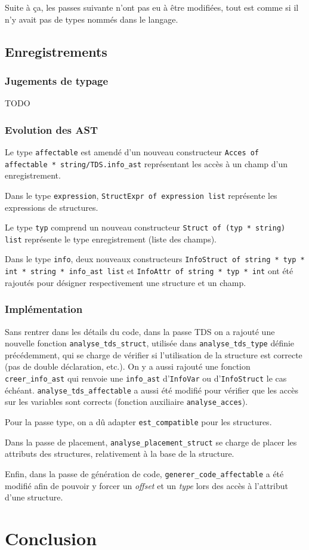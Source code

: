 \documentclass[headings=standardclasses,parskip=half]{scrartcl}
\begin{document}
Suite à ça, les passes suivante n'ont pas eu à être modifiées, tout
est comme si il n'y avait pas de types nommés dans le langage.

\subsection{Enregistrements}

\subsubsection*{Jugements de typage}

TODO

\subsubsection*{Evolution des AST}

Le type \texttt{affectable} est amendé d'un nouveau constructeur
\texttt{Acces of affectable * string/TDS.info\_ast} représentant les
accès à un champ d'un enregistrement.

Dans le type \texttt{expression}, \texttt{StructExpr of expression list}
représente les expressions de structures.

Le type \texttt{typ} comprend un nouveau constructeur
\texttt{Struct of (typ * string) list} représente le type enregistrement
(liste des champs).

Dans le type \texttt{info}, deux nouveaux constructeurs
\texttt{InfoStruct of string * typ * int * string * info\_ast list} et
\texttt{InfoAttr of string * typ * int}
ont été rajoutés pour désigner respectivement une structure et un champ.

\subsubsection*{Implémentation}

Sans rentrer dans les détails du code, dans la passe TDS on a rajouté
une nouvelle fonction \texttt{analyse\_tds\_struct}, utilisée dans
\texttt{analyse\_tds\_type} définie précédemment, qui se charge de
vérifier si l'utilisation de la structure est correcte (pas de double
déclaration, etc.). On y a aussi rajouté une fonction
\texttt{creer\_info\_ast} qui renvoie une \texttt{info\_ast}
d'\texttt{InfoVar} ou d'\texttt{InfoStruct} le cas échéant.
\texttt{analyse\_tds\_affectable} a aussi été modifié pour vérifier
que les accès sur les variables sont corrects (fonction auxiliaire
\texttt{analyse\_acces}).

Pour la passe type, on a dû adapter \texttt{est\_compatible}
pour les structures.

Dans la passe de placement, \texttt{analyse\_placement\_struct} se
charge de placer les attributs des structures, relativement à la base
de la structure.

Enfin, dans la passe de génération de code,
\texttt{generer\_code\_affectable} a été modifié afin de pouvoir
y forcer un \textit{offset} et un \textit{type} lors des accès
à l'attribut d'une structure.

\section{Conclusion}
\end{document}
